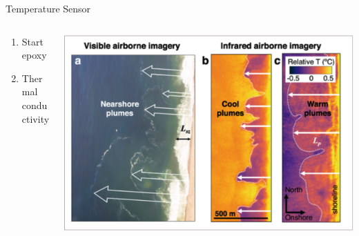 


\begin{frame}{Temperature Sensor}
    \begin{columns}
        \begin{column}{0.5\textwidth}
            \begin{enumerate}
                \item Start epoxy
                \item Thermal conductivity
            \end{enumerate}
        \end{column}
        \begin{column}{0.5\textwidth}
            \includegraphics[height=1\textheight,width=1\textwidth,keepaspectratio]{images/TempChanges.png}
        \end{column}
    \end{columns}
\end{frame}

